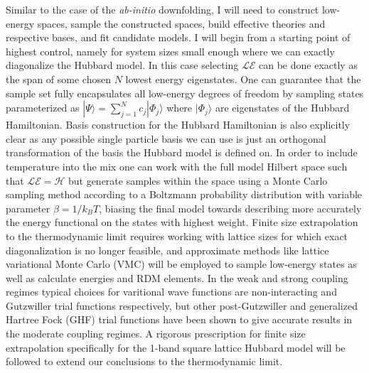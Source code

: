 \documentclass[12pt]{article}
\begin{document}
Similar to the case of the \textit{ab-initio} downfolding, I will need to construct low-energy spaces, sample the constructed spaces, build effective theories and respective bases, and fit candidate models.
I will begin from a starting point of highest control, namely for system sizes small enough where we can exactly diagonalize the Hubbard model.
In this case selecting $\mathcal{LE}$ can be done exactly as the span of some chosen $N$ lowest energy eigenstates. 
One can guarantee that the sample set fully encapsulates all low-energy degrees of freedom by sampling states parameterized as $|\Psi\rangle = \sum_{j=1}^N c_j |\Phi_j\rangle$ where $|\Phi_j\rangle$ are eigenstates of the Hubbard Hamiltonian.
Basis construction for the Hubbard Hamiltonian is also explicitly clear as any possible single particle basis we can use is just an orthogonal transformation of the basis the Hubbard model is defined on.
In order to include temperature into the mix one can work with the full model Hilbert space such that $\mathcal{LE} = \mathcal{H}$ but generate samples within the space using a Monte Carlo sampling method according to a Boltzmann probability distribution with variable parameter $\beta = 1/k_BT$, biasing the final model towards describing more accurately the energy functional on the states with highest weight.
Finite size extrapolation to the thermodynamic limit requires working with lattice sizes for which exact diagonalization is no longer feasible, and approximate methods like lattice variational Monte Carlo (VMC) will be employed to sample low-energy states as well as calculate energies and RDM elements.
In the weak and strong coupling regimes typical choices for varitional wave functions are non-interacting and Gutzwiller trial functions respectively, but other post-Gutzwiller and generalized Hartree Fock (GHF) trial functions have been shown to give accurate results in the moderate coupling regimes.
A rigorous prescription for finite size extrapolation specifically for the 1-band square lattice Hubbard model will be followed to extend our conclusions to the thermodynamic limit.
\end{document}
